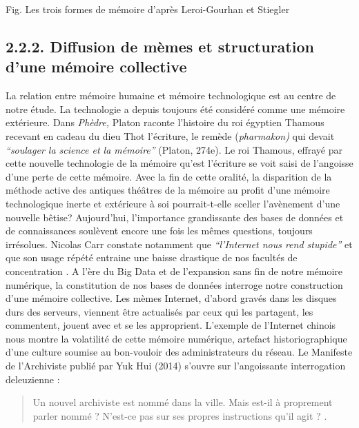 Fig. Les trois formes de m\'emoire d{\textquoteright}apr\`es
Leroi-Gourhan et Stiegler

\subsection[Diffusion de m\`emes et structuration d{\textquoteright}une m\'emoire collective]{2.2.2. Diffusion de m\`emes et structuration d{\textquoteright}une m\'emoire collective}
La relation entre m\'emoire humaine et m\'emoire technologique est au centre de notre \'etude. La technologie a depuis toujours \'et\'e consid\'er\'e comme une m\'emoire ext\'erieure. Dans \textit{Ph\`edre, }Platon raconte l{\textquoteright}histoire du roi \'egyptien Thamous recevant en cadeau du dieu Thot l{\textquoteright}\'ecriture, le rem\`ede (\textit{pharmakon) }qui devait \textit{{\textquotedblleft}soulager la science et la m\'emoire{\textquotedblright} }(Platon, 274e). Le roi Thamous, effray\'e par cette nouvelle technologie de la m\'emoire qu{\textquoteright}est l{\textquoteright}\'ecriture se voit saisi de l{\textquoteright}angoisse d{\textquoteright}une perte de cette m\'emoire. Avec la fin de cette oralit\'e, la disparition de la m\'ethode active des antiques th\'e\^atres de la m\'emoire au profit d{\textquoteright}une m\'emoire technologique inerte et ext\'erieure \`a soi pourrait-t-elle sceller l{\textquoteright}av\`enement d{\textquoteright}une nouvelle b\^etise? Aujourd{\textquoteright}hui, l{\textquoteright}importance grandissante des bases de donn\'ees et de connaissances soul\`event encore une fois les m\^emes questions, toujours irr\'esolues. Nicolas Carr constate notamment que \textit{{\textquotedblleft}l{\textquoteright}Internet nous rend stupide{\textquotedblright}} et que son usage r\'ep\'et\'e entraine une baisse drastique de nos facult\'es de concentration \cite{Carr2010}. A l{\textquoteright}\`ere du Big Data et de l{\textquoteright}expansion sans fin de notre m\'emoire num\'erique, la constitution de nos bases de donn\'ees interroge notre construction d{\textquoteright}une m\'emoire collective. Les m\`emes Internet, d{\textquoteright}abord grav\'es dans les disques durs des serveurs, viennent \^etre actualis\'es par ceux qui les partagent, les commentent, jouent avec et se les approprient. L{\textquoteright}exemple de l{\textquoteright}Internet chinois nous montre la volatilit\'e de cette m\'emoire num\'erique, artefact historiographique d{\textquoteright}une culture soumise au bon-vouloir des administrateurs du r\'eseau. Le Manifeste de l{\textquoteright}Archiviste publi\'e par Yuk Hui (2014) s{\textquoteright}ouvre sur l{\textquoteright}angoissante interrogation deleuzienne :  \begin{quote}
Un nouvel archiviste est nomm\'e dans la ville. Mais est-il \`a proprement parler nomm\'e ?
N'est-ce pas sur ses propres instructions qu'il agit ? 
\cite{Deleuze1984}.
\end{quote}

